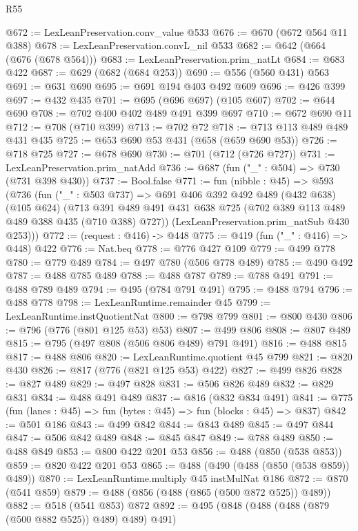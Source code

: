 \begin{lexlean}{R55}
\begin{coremodule}
@672 := LexLeanPreservation.conv_value @533
@676 := @670 (@672 @564 @11 @388)
@678 := LexLeanPreservation.convL_nil @533
@682 := @642 (@664 (@676 (@678 @564)))
@683 := LexLeanPreservation.prim_natLt
@684 := @683 @422
@687 := @629 (@682 (@684 @253))
@690 := @556 (@560 @431) @563
@691 := @631 @690
@695 := @691 @194 @403 @492 @609
@696 := @426 @399
@697 := @432 @435
@701 := @695 (@696 @697) (@105 @607)
@702 := @644 @690
@708 := @702 @400 @402 @489 @491 @399 @697
@710 := @672 @690 @11
@712 := @708 (@710 @399)
@713 := @702 @72
@718 := @713 @113 @489 @489 @431 @435
@725 := @653 @690 @53 @431 (@658 (@659 @690 @53))
@726 := @718 @725
@727 := @678 @690
@730 := @701 (@712 (@726 @727))
@731 := LexLeanPreservation.prim_natAdd
@736 := @687 (fun ("_" : @504) => @730 (@731 @398 @430))
@737 := Bool.false
@771 := fun (nibble : @45) =>
  @593
    (@736
      (fun ("_" : @503 @737) =>
      @691
        @406
        @392
        @492
        @489
        (@432 @638)
        (@105 @624)
        (@713 @391 @489 @491 @431 @638 @725 (@702 @389 @113 @489 @489 @388 @435 (@710 @388) @727))
        (LexLeanPreservation.prim_natSub @430 @253)))
@772 := (request : @416) -> @448
@775 := @419 (fun ("_" : @416) => @448) @422
@776 := Nat.beq
@778 := @776 @427 @109
@779 := @499 @778
@780 := @779 @489
@784 := @497 @780 (@506 @778 @489)
@785 := @490 @492
@787 := @488 @785 @489
@788 := @488 @787
@789 := @788 @491
@791 := @488 @789 @489
@794 := @495 (@784 @791 @491)
@795 := @488 @794
@796 := @488 @778
@798 := LexLeanRuntime.remainder @45
@799 := LexLeanRuntime.instQuotientNat
@800 := @798 @799
@801 := @800 @430
@806 := @796 (@776 (@801 @125 @53) @53)
@807 := @499 @806
@808 := @807 @489
@815 := @795 (@497 @808 (@506 @806 @489) @791 @491)
@816 := @488 @815
@817 := @488 @806
@820 := LexLeanRuntime.quotient @45 @799
@821 := @820 @430
@826 := @817 (@776 (@821 @125 @53) @422)
@827 := @499 @826
@828 := @827 @489
@829 := @497 @828
@831 := @506 @826 @489
@832 := @829 @831
@834 := @488 @491 @489
@837 := @816 (@832 @834 @491)
@841 := @775 (fun (lanes : @45) => fun (bytes : @45) => fun (blocks : @45) => @837)
@842 := @501 @186
@843 := @499 @842
@844 := @843 @489
@845 := @497 @844
@847 := @506 @842 @489
@848 := @845 @847
@849 := @788 @489
@850 := @488 @849
@853 := @800 @422 @201 @53
@856 := @488 (@850 (@538 @853))
@859 := @820 @422 @201 @53
@865 := @488 (@490 (@488 (@850 (@538 @859)) @489))
@870 := LexLeanRuntime.multiply @45 instMulNat @186
@872 := @870 (@541 @859)
@879 := @488 (@856 (@488 (@865 (@500 @872 @525)) @489))
@882 := @518 (@541 @853) @872
@892 := @495 (@848 (@488 (@488 (@879 (@500 @882 @525)) @489) @489) @491)

\end{coremodule}
\end{lexlean}
